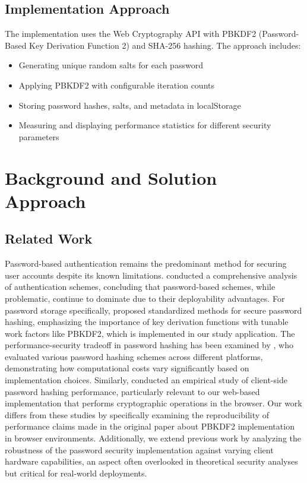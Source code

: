 \documentclass[11pt,a4paper]{article}
\begin{document}
            \subsection{Implementation Approach} 
            The implementation uses the Web Cryptography API with PBKDF2 (Password-Based Key Derivation Function 2) and SHA-256 hashing. The approach includes:
            \begin{itemize}
              \item Generating unique random salts for each password
              \item Applying PBKDF2 with configurable iteration counts
              \item Storing password hashes, salts, and metadata in localStorage
              \item Measuring and displaying performance statistics for different security parameters
            \end{itemize}


\section{Background and Solution Approach} 
\subsection{Related Work}
Password-based authentication remains the predominant method for securing user accounts despite its known limitations. \cite{bonneau2012quest} conducted a comprehensive analysis of authentication schemes, concluding that password-based schemes, while problematic, continue to dominate due to their deployability advantages. For password storage specifically, \cite{turan2018recommendation} proposed standardized methods for secure password hashing, emphasizing the importance of key derivation functions with tunable work factors like PBKDF2, which is implemented in our study application.
The performance-security tradeoff in password hashing has been examined by \cite{visconti2020evaluate}, who evaluated various password hashing schemes across different platforms, demonstrating how computational costs vary significantly based on implementation choices. Similarly, \cite{pesante2021empirical} conducted an empirical study of client-side password hashing performance, particularly relevant to our web-based implementation that performs cryptographic operations in the browser. Our work differs from these studies by specifically examining the reproducibility of performance claims made in the original paper about PBKDF2 implementation in browser environments. Additionally, we extend previous work by analyzing the robustness of the password security implementation against varying client hardware capabilities, an aspect often overlooked in theoretical security analyses but critical for real-world deployments.
\end{document}
